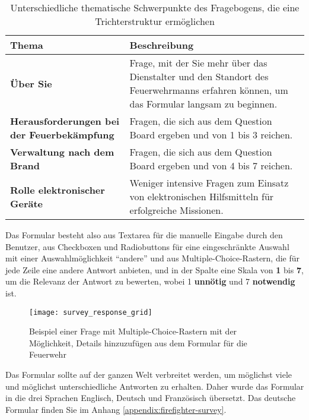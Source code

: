 \begin{table}[H]
  \begin{tabular}{p{0.4\linewidth} |p{0.6\linewidth}}
    Thema                                              & Beschreibung                                                                                                                           \\ \hline\hline

    \textbf{Über Sie}                                  & Frage, mit der Sie mehr über das Dienstalter und den Standort des Feuerwehrmanns erfahren können, um das Formular langsam zu beginnen. \\\hline
    \textbf{Herausforderungen bei der Feuerbekämpfung} & Fragen, die sich aus dem Question Board ergeben und von 1 bis 3 reichen.                                                               \\\hline
    \textbf{Verwaltung nach dem Brand}                 & Fragen, die sich aus dem Question Board ergeben und von 4 bis 7 reichen.                                                               \\\hline
    \textbf{Rolle elektronischer Geräte}               & Weniger intensive Fragen zum Einsatz von elektronischen Hilfsmitteln für erfolgreiche Missionen.
    \\\hline
  \end{tabular}
  \caption{Unterschiedliche thematische Schwerpunkte des Fragebogens, die eine Trichterstruktur ermöglichen}
\end{table}

Das Formular besteht also aus Textarea für die manuelle Eingabe durch den Benutzer, aus Checkboxen und Radiobuttons für eine eingeschränkte Auswahl mit einer Auswahlmöglichkeit ``andere'' und aus Multiple-Choice-Rastern, die für jede Zeile eine andere Antwort anbieten, und in der Spalte eine Skala von \textbf{1} bis \textbf{7}, um die Relevanz der Antwort zu bewerten, wobei 1 \textbf{unnötig} und 7 \textbf{notwendig} ist.

\begin{figure}[H]
  \centering
  \texttt{[image: survey\_response\_grid]}
  \caption{Beispiel einer Frage mit Multiple-Choice-Rastern mit der Möglichkeit, Details hinzuzufügen aus dem Formular für die Feuerwehr}
  \label{fig:survey_response_grid}
\end{figure}

Das Formular sollte auf der ganzen Welt verbreitet werden, um möglichst viele und möglichst unterschiedliche Antworten zu erhalten.
Daher wurde das Formular in die drei Sprachen Englisch, Deutsch und Französisch übersetzt.
Das deutsche Formular finden Sie im Anhang \ref{appendix:firefighter-survey}.

